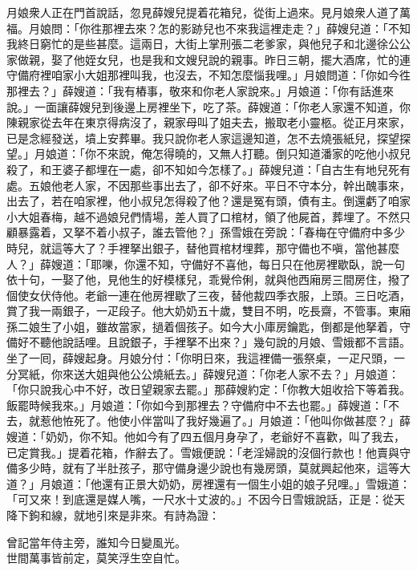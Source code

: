 月娘衆人正在門首說話，忽見薛嫂兒提着花箱兒，從街上過來。見月娘衆人道了萬福。月娘問：「你徃那裡去來？怎的影跡兒也不來我這裡走走？」薛嫂兒道：「不知我終日窮忙的是些甚麼。這兩日，大街上掌刑張二老爹家，與他兒子和北邊徐公公家做親，娶了他姪女兒，也是我和文嫂兒說的親事。昨日三朝，擺大酒席，忙的連守備府裡咱家小大姐那裡叫我，也沒去，不知怎麼惱我哩。」月娘問道：「你如今徃那裡去？」薛嫂道：「我有樁事，敬來和你老人家說來。」月娘道：「你有話進來說。」一面讓薛嫂兒到後邊上房裡坐下，吃了茶。薛嫂道：「你老人家還不知道，你陳親家從去年在東京得病沒了，親家母叫了姐夫去，搬取老小靈柩。從正月來家，已是念經發送，墳上安葬畢。我只說你老人家這邊知道，怎不去燒張紙兒，探望探望。」月娘道：「你不來說，俺怎得曉的，又無人打聽。{}倒只知道潘家的吃他小叔兒殺了，和王婆子都埋在一處，卻不知如今怎樣了。」薛嫂兒道：「自古生有地兒死有處。五娘他老人家，不因那些事出去了，卻不好來。平日不守本分，幹出醜事來，出去了，若在咱家裡，他小叔兒怎得殺了他？還是冤有頭，債有主。倒還虧了咱家小大姐春梅，越不過娘兒們情場，差人買了口棺材，領了他屍首，葬埋了。不然只顧暴露着，又拏不着小叔子，誰去管他？」孫雪娥在旁說：「春梅在守備府中多少時兒，就這等大了？手裡拏出銀子，替他買棺材埋葬，那守備也不嗔，當他甚麼人？」{}薛嫂道：「耶嚛，你還不知，守備好不喜他，每日只在他房裡歇臥，說一句依十句，一娶了他，見他生的好模樣兒，乖覺伶俐，就與他西廂房三間房住，撥了個使女伏侍他。老爺一連在他房裡歇了三夜，替他裁四季衣服，上頭。三日吃酒，賞了我一兩銀子，一疋段子。他大奶奶五十歲，雙目不明，吃長齋，不管事。東廂孫二娘生了小姐，雖故當家，撾着個孩子。如今大小庫房鑰匙，倒都是他拏着，守備好不聽他說話哩。且說銀子，手裡拏不出來？」{}幾句說的月娘、雪娥都不言語。坐了一囘，薛嫂起身。月娘分付：「你明日來，我這裡備一張祭桌，一疋尺頭，一分冥紙，你來送大姐與他公公燒紙去。」薛嫂兒道：「你老人家不去？」月娘道：「你只說我心中不好，改日望親家去罷。」{}那薛嫂約定：「你教大姐收拾下等着我。飯罷時候我來。」月娘道：「你如今到那裡去？守備府中不去也罷。」薛嫂道：「不去，就惹他恠死了。他使小伴當叫了我好幾遍了。」月娘道：「他叫你做甚麼？」薛嫂道：「奶奶，你不知。他如今有了四五個月身孕了，老爺好不喜歡，叫了我去，已定賞我。」提着花箱，作辭去了。雪娥便說：「老淫婦說的沒個行款也！他賣與守備多少時，就有了半肚孩子，那守備身邊少說也有幾房頭，莫就興起他來，這等大道？」{}月娘道：「他還有正景大奶奶，房裡還有一個生小姐的娘子兒哩。」雪娥道：「可又來！到底還是媒人嘴，一尺水十丈波的。」不因今日雪娥說話，正是：從天降下鉤和線，就地引來是非來。有詩為證：

\begin{myquote}
曾記當年侍主旁，誰知今日變風光。\\世間萬事皆前定，莫笑浮生空自忙。
\end{myquote}


